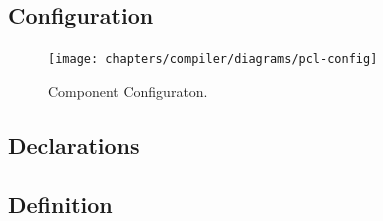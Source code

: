 \subsection{Configuration}
\begin{figure}[!h]
  \centering
    \texttt{[image: chapters/compiler/diagrams/pcl-config]}
  \caption{Component Configuraton.}
  \label{fig:pcl-config}
\end{figure}

\subsection{Declarations}

\subsection{Definition}
